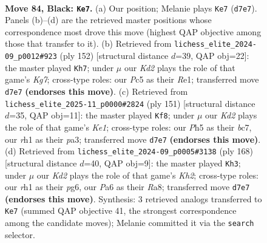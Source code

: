 \documentclass[11pt]{article}
\begin{document}
\clearpage

\begin{figure}[p]\centering
\begin{subfigure}{0.46\textwidth}\centering
\resizebox{\linewidth}{!}{%
\newchessgame
\chessboard[
  setfen={6r1/3k4/p7/Ppp2p1p/2p2P1P/4PKP1/1P6/7R b - - 14 84},
  showmover=false,
  pgfstyle=straightmove, color=movearrow, markmove={d7-e7}
]}
\caption{}
\end{subfigure}\hfill
\begin{subfigure}{0.46\textwidth}\centering
\resizebox{\linewidth}{!}{%
\newchessgame
\chessboard[
  setfen={8/2pk2K1/1p1p2P1/p2P4/P1P5/1P3r2/8/4R3 w - - 14 77},
  showmover=false,
  pgfstyle=straightmove, color=movearrow, markmove={g7-h7}
]}
\caption{}
\end{subfigure}
\\[4pt]
\begin{subfigure}{0.46\textwidth}\centering
\resizebox{\linewidth}{!}{%
\newchessgame
\chessboard[
  setfen={4k3/2B3p1/p4p1p/1p1p3P/3P2P1/P1P2PK1/8/3b4 b - - 32 76},
  showmover=false,
  pgfstyle=straightmove, color=movearrow, markmove={e8-f8}
]}
\caption{}
\end{subfigure}\hfill
\begin{subfigure}{0.46\textwidth}\centering
\resizebox{\linewidth}{!}{%
\newchessgame
\chessboard[
  setfen={R7/2r4p/6pP/4kpP1/4p3/4P3/5P1K/8 w - - 54 85},
  showmover=false,
  pgfstyle=straightmove, color=movearrow, markmove={h2-h3}
]}
\caption{}
\end{subfigure}
\caption{\textbf{Move 84, Black: \texttt{Ke7}.} (a) Our position; Melanie plays \texttt{Ke7} (\texttt{d7e7}). Panels (b)--(d) are the retrieved master positions whose correspondence most drove this move (highest QAP objective among those that transfer to it). (b) Retrieved from \texttt{lichess\_elite\_2024-09\_p0012\#923} (ply 152) [structural distance $d$=39, QAP obj=22]: the master played \texttt{Kh7}; under $\mu$ our \emph{Kd2} plays the role of that game's \emph{Kg7}; cross-type roles: our \emph{P}c5 as their \emph{R}e1; transferred move \texttt{d7e7} \textbf{(endorses this move)}. (c) Retrieved from \texttt{lichess\_elite\_2025-11\_p0000\#2824} (ply 151) [structural distance $d$=35, QAP obj=11]: the master played \texttt{Kf8}; under $\mu$ our \emph{Kd2} plays the role of that game's \emph{Ke1}; cross-type roles: our \emph{P}h5 as their \emph{b}c7, our \emph{r}h1 as their \emph{p}a3; transferred move \texttt{d7e7} \textbf{(endorses this move)}. (d) Retrieved from \texttt{lichess\_elite\_2024-09\_p0005\#3138} (ply 168) [structural distance $d$=40, QAP obj=9]: the master played \texttt{Kh3}; under $\mu$ our \emph{Kd2} plays the role of that game's \emph{Kh2}; cross-type roles: our \emph{r}h1 as their \emph{p}g6, our \emph{P}a6 as their \emph{R}a8; transferred move \texttt{d7e7} \textbf{(endorses this move)}. Synthesis: 3 retrieved analogs transferred to \texttt{Ke7} (summed QAP objective 41, the strongest correspondence among the candidate moves); Melanie committed it via the \texttt{search} selector.}
\label{fig:thought-m167}
\end{figure}
\end{document}
